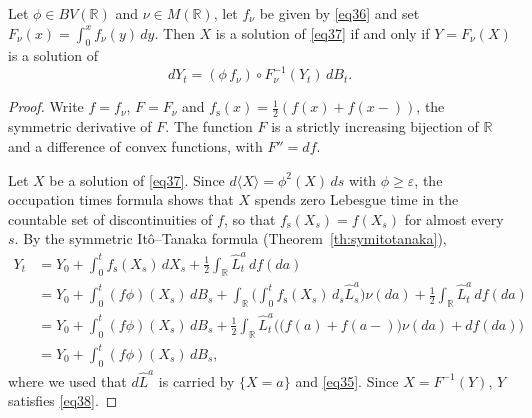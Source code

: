 \begin{proposition}\label{prop31}
	Let $\phi\in BV(\mathbb{R})$ and $\nu\in M(\mathbb{R})$, let $f_\nu$ be given by
	\eqref{eq36} and set $F_\nu (x)=\int_0^x f_\nu (y)\,dy$. Then $X$ is a solution of
	\eqref{eq37} if and only if $Y=F_\nu(X)$ is a solution of
	\begin{equation}\label{eq38}
		dY_t=(\phi \, f_\nu) \circ F_{\nu}^{-1}(Y_t)\,dB_t .
	\end{equation}
\end{proposition}

\begin{proof}
	Write $f = f_\nu$, $F = F_\nu$ and $f_{\mathrm{s}}(x) = \frac{1}{2}(f(x)+f(x-))$,
	the symmetric derivative of $F$. The function $F$ is a strictly increasing
	bijection of $\mathbb{R}$ and a difference of convex functions, with $F'' = df$.

	Let $X$ be a solution of \eqref{eq37}. Since $d\langle X\rangle = \phi^2(X)\,ds$ with
	$\phi\geqslant\varepsilon$, the occupation times formula shows that $X$ spends
	zero Lebesgue time in the countable set of discontinuities of $f$, so that
	$f_{\mathrm{s}}(X_s) = f(X_s)$ for almost every $s$. By the symmetric It\^o--Tanaka
	formula (Theorem~\ref{th:symitotanaka}),
	\begin{align*}
		Y_t & = Y_0+\int_0^t f_{\mathrm{s}}(X_s)\,dX_s + \frac{1}{2}\int_\mathbb{R} \hat{L}_t^a\, df(da)                                  \\
		    & =Y_0+\int_0^t (f\phi)(X_s)\, dB_s +\int_\mathbb{R}\Big(\int_0^t f_{\mathrm{s}}(X_s)\,d_s \hat{L}_s^a\Big)\nu(da)
		+\frac{1}{2}\int_\mathbb{R} \hat{L}_t^a\, df(da)                                                                                  \\
		    & = Y_0+\int_0^t (f\phi)(X_s)\, dB_s + \frac{1}{2}\int_\mathbb{R} \hat{L}_t^a \Big(\big(f(a)+f(a-)\big) \nu(da) + df(da)\Big) \\
		    & = Y_0+\int_0^t (f\phi)(X_s)\, dB_s ,
	\end{align*}
	where we used that $d\hat{L}^a$ is carried by $\{X = a\}$ and \eqref{eq35}. Since
	$X = F^{-1}(Y)$, $Y$ satisfies \eqref{eq38}.


\end{proof}
